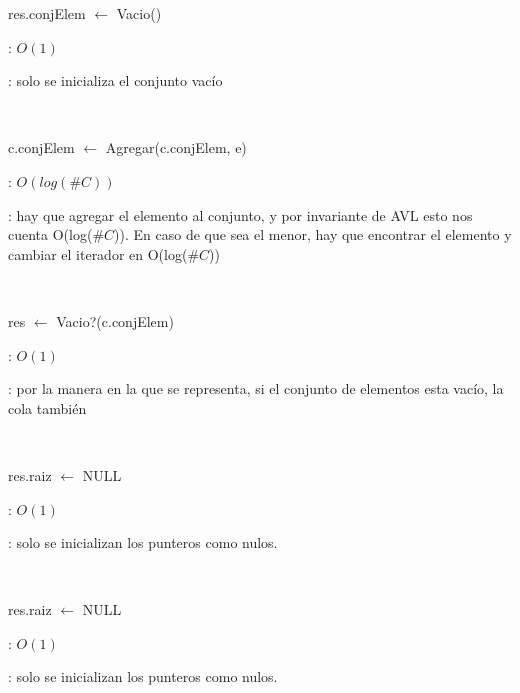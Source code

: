 \begin{Algoritmos}

	\begin{algorithm}[H]
		\NoCaptionOfAlgo
		\caption{}
		res.conjElem $\leftarrow$ Vacio()
	\end{algorithm}

	\complejidad: $O(1)$

	\justifcomp: solo se inicializa el conjunto vacío

	~

	\begin{algorithm}[H]
		\NoCaptionOfAlgo
		\caption{}
		c.conjElem $\leftarrow$ Agregar(c.conjElem, e)
	\end{algorithm}

	\complejidad: $O(log(\#C))$

	\justifcomp: hay que agregar el elemento al conjunto, y por invariante de AVL esto nos cuenta O(log($\#C$)). En caso de que sea el menor, hay que encontrar el elemento y cambiar el iterador en O(log($\#C$))

	~

	\begin{algorithm}[H]
		\NoCaptionOfAlgo
		\caption{}
		res $\leftarrow$ Vacio?(c.conjElem) %
	\end{algorithm}

	\complejidad: $O(1)$

	\justifcomp: por la manera en la que se representa, si el conjunto de elementos esta vacío, la cola también

	~

	\begin{algorithm}[H]
		\NoCaptionOfAlgo
		\caption{}
		res.raiz $\leftarrow$ NULL
	\end{algorithm}

	\complejidad: $O(1)$

	\justifcomp: solo se inicializan los punteros como nulos.

	~

	\begin{algorithm}[H]
		\NoCaptionOfAlgo
		\caption{}
		res.raiz $\leftarrow$ NULL
	\end{algorithm}

	\complejidad: $O(1)$

	\justifcomp: solo se inicializan los punteros como nulos.

\end{Algoritmos}